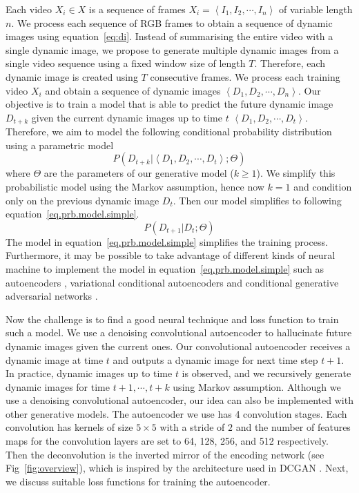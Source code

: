 Each video $X_i \in X$ is a sequence of frames $X_i= \left< I_1, I_2, \cdots, I_n \right> $ of variable length $n$. 
We process each sequence of RGB frames to obtain a sequence of dynamic images using equation~\ref{eq:di}. 
Instead of summarising the entire video with a single dynamic image, we propose to generate multiple dynamic images from a single video sequence using a fixed window size of length $T$. 
Therefore, each dynamic image is created using $T$ consecutive frames. 
We process each training video $X_i$ and obtain a sequence of dynamic images $\left< D_1, D_2, \cdots, D_{n} \right> $. 
Our objective is to train a model that is able to predict the future dynamic image $D_{t+k}$ given the current dynamic images up to time $t$ \ie $\left< D_1, D_2, \cdots, D_t \right>$. 
Therefore, we aim to model the following conditional probability distribution using a parametric model
\begin{equation}
P(D_{t+k} | \left< D_1, D_2, \cdots, D_t \right>; \Theta)
\label{eq.prb.model}
\end{equation} 
where $\Theta$ are the parameters of our generative model ($k\ge1$). 
We simplify this probabilistic model using the Markov assumption, hence now $k=1$ and condition only on the previous dynamic image $D_t$. Then our model simplifies to following equation~\ref{eq.prb.model.simple}.
\begin{equation}
P(D_{t+1} | D_t ; \Theta)
\label{eq.prb.model.simple}
\end{equation} 
The model in equation~\ref{eq.prb.model.simple} simplifies the training process. 
Furthermore, it may be possible to take advantage of different kinds of neural machine to implement the model in equation~\ref{eq.prb.model.simple} such as autoencoders \cite{baldi2012autoencoders}, variational conditional autoencoders \cite{kingma2014semi,sohn2015learning} and conditional generative adversarial networks \cite{mirza2014conditional}.

Now the challenge is to find a good neural technique and loss function to train such a model. 
We use a denoising convolutional autoencoder to hallucinate future dynamic images given the current ones.
Our convolutional autoencoder receives a dynamic image at time $t$ and outputs a dynamic image for next time step $t+1$. 
In practice, dynamic images up to time $t$ is observed, and we recursively generate dynamic images for time $t+1, \cdots, t+k$ using Markov assumption.
Although we use a denoising convolutional autoencoder, our idea can also be implemented with other generative models.
The autoencoder we use has 4 convolution stages. Each convolution has kernels of size $5 \times 5$ with a stride of $2$ and the number of features maps for the convolution layers are set to 64, 128, 256, and 512 respectively. Then the deconvolution is the inverted mirror of the encoding network (see Fig~\ref{fig:overview}), which is inspired by the architecture used in DCGAN \cite{RadfordMC15}.
%
%
Next, we discuss suitable loss functions for training the autoencoder.
%
